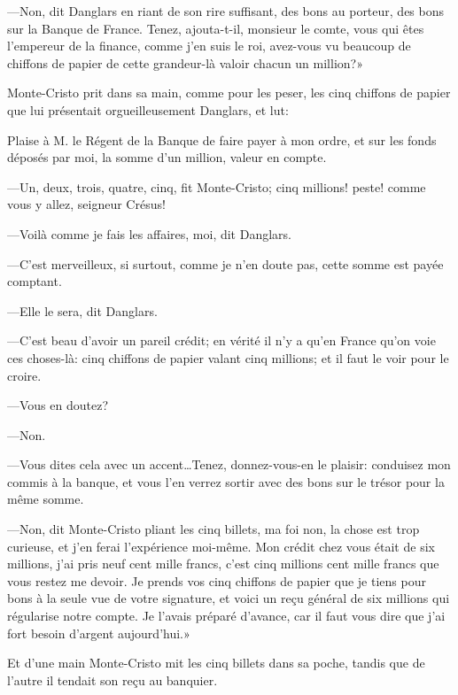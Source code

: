 —Non, dit Danglars en riant de son rire suffisant, des bons au porteur, des bons sur la Banque de France. Tenez, ajouta-t-il, monsieur le comte, vous qui êtes l'empereur de la finance, comme j'en suis le roi, avez-vous vu beaucoup de chiffons de papier de cette grandeur-là valoir chacun un million?» 

Monte-Cristo prit dans sa main, comme pour les peser, les cinq chiffons de papier que lui présentait orgueilleusement Danglars, et lut: 


\begin{mail}{}{}
Plaise à M. le Régent de la Banque de faire payer à mon ordre, et sur les fonds déposés par moi, la somme d'un million, valeur en compte. 

\end{mail}


—Un, deux, trois, quatre, cinq, fit Monte-Cristo; cinq millions! peste! comme vous y allez, seigneur Crésus! 

—Voilà comme je fais les affaires, moi, dit Danglars. 

—C'est merveilleux, si surtout, comme je n'en doute pas, cette somme est payée comptant. 

—Elle le sera, dit Danglars. 

—C'est beau d'avoir un pareil crédit; en vérité il n'y a qu'en France qu'on voie ces choses-là: cinq chiffons de papier valant cinq millions; et il faut le voir pour le croire. 

—Vous en doutez? 

—Non. 

—Vous dites cela avec un accent\dots Tenez, donnez-vous-en le plaisir: conduisez mon commis à la banque, et vous l'en verrez sortir avec des bons sur le trésor pour la même somme. 

—Non, dit Monte-Cristo pliant les cinq billets, ma foi non, la chose est trop curieuse, et j'en ferai l'expérience moi-même. Mon crédit chez vous était de six millions, j'ai pris neuf cent mille francs, c'est cinq millions cent mille francs que vous restez me devoir. Je prends vos cinq chiffons de papier que je tiens pour bons à la seule vue de votre signature, et voici un reçu général de six millions qui régularise notre compte. Je l'avais préparé d'avance, car il faut vous dire que j'ai fort besoin d'argent aujourd'hui.» 

Et d'une main Monte-Cristo mit les cinq billets dans sa poche, tandis que de l'autre il tendait son reçu au banquier. 


